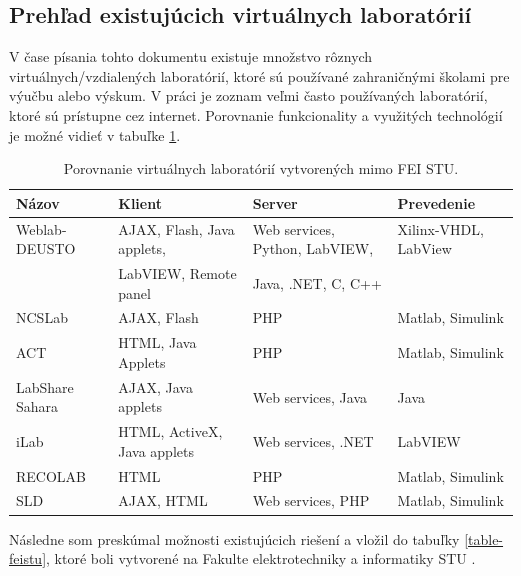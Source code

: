 \subsection{Prehľad existujúcich virtuálnych laboratórií}
V čase písania tohto dokumentu existuje množstvo rôznych virtuálnych/vzdialených laboratórií, ktoré sú používané zahraničnými školami pre výučbu alebo výskum. V práci \cite{vlabtablecomparison} je zoznam veľmi často používaných laboratórií, ktoré sú prístupne cez internet. Porovnanie funkcionality a využitých technológií je možné vidieť v tabuľke \ref{table-vlab-comparison}.

\begin{table}[H]
\scriptsize
\begin{tabular}{l l l l}
\hline\hline
\textbf{Názov} & \textbf{Klient} & \textbf{Server} & \textbf{Prevedenie}\\ \hline
Weblab-DEUSTO & AJAX, Flash, Java applets, & Web services, Python, LabVIEW, & Xilinx-VHDL, LabView\\
&LabVIEW, Remote panel & Java, .NET, C, C++ &\\ \hline
NCSLab & AJAX, Flash & PHP & Matlab, Simulink\\ \hline
ACT & HTML, Java Applets & PHP & Matlab, Simulink\\ \hline
LabShare Sahara & AJAX, Java applets & Web services, Java & Java\\ \hline
iLab & HTML, ActiveX, Java applets & Web services, .NET & LabVIEW\\ \hline
RECOLAB & HTML & PHP & Matlab, Simulink\\ \hline
SLD & AJAX, HTML & Web services, PHP & Matlab, Simulink\\ \hline\hline
\end{tabular}
\caption{Porovnanie virtuálnych laboratórií vytvorených mimo FEI STU.}
\label{table-vlab-comparison}
\end{table}

Následne som preskúmal možnosti existujúcich riešení a vložil do tabuľky \ref{table-feistu}, ktoré boli vytvorené na Fakulte elektrotechniky a informatiky STU \cite{table-vlab-farkas}\cite{table-vlab-borka}\cite{table-vlab-kundrat}\cite{table-vlab-cerveny}\cite{table-vlab-varga}.

